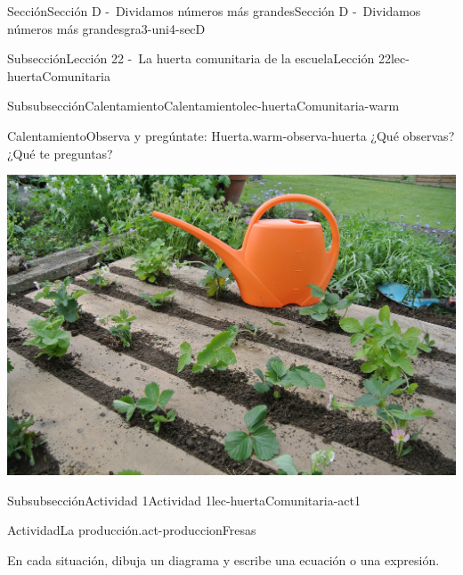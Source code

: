 \documentclass[twoside,10pt,]{article}
\begin{document}
\begin{sectionptx}{Sección}{Sección D -~Dividamos números más grandes}{}{Sección D -~Dividamos números más grandes}{}{}{gra3-uni4-secD}
\begin{subsectionptx}{Subsección}{Lección 22 -~La huerta comunitaria de la escuela}{}{Lección 22}{}{}{lec-huertaComunitaria}
\typeout{************************************************}
%
\begin{subsubsectionptx}{Subsubsección}{Calentamiento}{}{Calentamiento}{}{}{lec-huertaComunitaria-warm}
\begin{exploration}{Calentamiento}{Observa y pregúntate: Huerta.}{warm-observa-huerta}%
¿Qué observas?\\
 ¿Qué te preguntas?%
\begin{image}{0.125}{0.75}{0.125}{}%
\includegraphics[width=\linewidth]{external/jpg-source/3-4-D-22-warm-garden-934189_1920.jpg}
\end{image}%
\end{exploration}%
%
\end{subsubsectionptx}
%
%
\typeout{************************************************}
\typeout{************************************************}
%
\begin{subsubsectionptx}{Subsubsección}{Actividad 1}{}{Actividad 1}{}{}{lec-huertaComunitaria-act1}
\begin{activity}{Actividad}{La producción.}{act-produccionFresas}%
\begin{sidebyside}{2}{0.025}{0.025}{0.05}%
\begin{sbspanel}{0.6}%
En cada situación, dibuja un diagrama y escribe una ecuación o una expresión.%
\end{sbspanel}%
\begin{sbspanel}{0.3}%

\end{sbspanel}
\end{sidebyside}
\end{activity}
\end{subsubsectionptx}
\end{subsectionptx}
\end{sectionptx}
\end{document}
